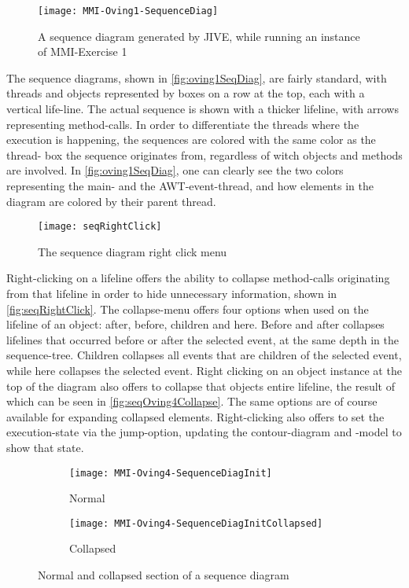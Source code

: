 \begin{figure}[H]
	\centering
	\texttt{[image: MMI-Oving1-SequenceDiag]}
	\caption{A sequence diagram generated by JIVE, while running an instance of MMI-Exercise 1}
	\label{fig:oving1SeqDiag}
\end{figure}
The sequence diagrams, shown in \autoref{fig:oving1SeqDiag}, are fairly standard, with threads and objects represented by boxes on a row at the top, each with a vertical life-line.
The actual sequence is shown with a thicker lifeline, with arrows representing method-calls.
In order to differentiate the threads where the execution is happening, the sequences are colored with the same color as the thread- box the sequence originates from, regardless of witch objects and methods are involved.
In \autoref{fig:oving1SeqDiag}, one can clearly see the two colors representing the main- and the AWT-event-thread, and how elements in the diagram are colored by their parent thread.
\begin{figure}[H]
	\centering
	\texttt{[image: seqRightClick]}
	\caption{The sequence diagram right click menu}
	\label{fig:seqRightClick}
\end{figure}
Right-clicking on a lifeline offers the ability to collapse method-calls originating from that lifeline in order to hide unnecessary information, shown in \autoref{fig:seqRightClick}.
The collapse-menu offers four options when used on the lifeline of an object: after, before, children and here.
Before and after collapses lifelines that occurred before or after the selected event, at the same depth in the sequence-tree.
Children collapses all events that are children of the selected event, while here collapses the selected event.%
Right clicking on an object instance at the top of the diagram also offers to collapse that objects entire lifeline, the result of which can be seen in \autoref{fig:seqOving4Collapse}.
The same options are of course available for expanding collapsed elements.
Right-clicking also offers to set the execution-state via the jump-option, updating the contour-diagram and -model to show that state.
~\\

\begin{figure}[H]
	\centering
	\begin{subfigure}{\textwidth}
		\centering
		\texttt{[image: MMI-Oving4-SequenceDiagInit]}
		\caption{Normal}
		\label{fig:seqOving4CollapseA}
	\end{subfigure}
	\begin{subfigure}{\textwidth}
		\centering
		\texttt{[image: MMI-Oving4-SequenceDiagInitCollapsed]}
		\caption{Collapsed}
		\label{fig:seqOving4CollapseB}
	\end{subfigure}
	\caption{Normal and collapsed section of a sequence diagram}
	\label{fig:seqOving4Collapse} 
\end{figure}

